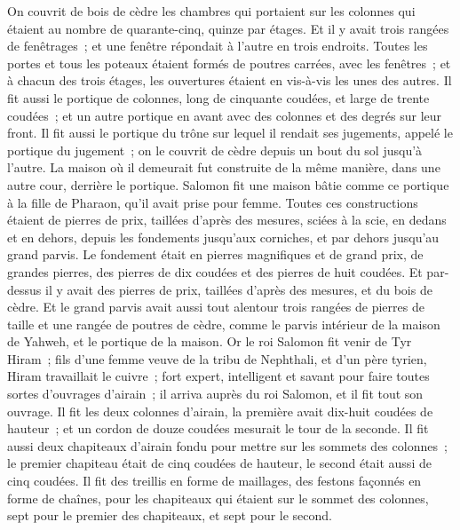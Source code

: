 \begin{multicols}{2}
On couvrit de bois de cèdre les chambres qui portaient sur les colonnes qui étaient au nombre de quarante-cinq, quinze par étages.
Et il y avait trois rangées de fenêtrages~; et une fenêtre répondait à l'autre en trois endroits.
Toutes les portes et tous les poteaux étaient formés de poutres carrées, avec les fenêtres~; et à chacun des trois étages, les ouvertures étaient en vis-à-vis les unes des autres.
Il fit aussi le portique de colonnes, long de cinquante coudées, et large de trente coudées~; et un autre portique en avant avec des colonnes et des degrés sur leur front.
Il fit aussi le portique du trône sur lequel il rendait ses jugements, appelé le portique du jugement~; on le couvrit de cèdre depuis un bout du sol jusqu'à l'autre.
La maison où il demeurait fut construite de la même manière, dans une autre cour, derrière le portique. Salomon fit une maison bâtie comme ce portique à la fille de Pharaon, qu'il avait prise pour femme.
Toutes ces constructions étaient de pierres de prix, taillées d'après des mesures, sciées à la scie, en dedans et en dehors, depuis les fondements jusqu'aux corniches, et par dehors jusqu'au grand parvis.
Le fondement était en pierres magnifiques et de grand prix, de grandes pierres, des pierres de dix coudées et des pierres de huit coudées.
Et par-dessus il y avait des pierres de prix, taillées d'après des mesures, et du bois de cèdre.
Et le grand parvis avait aussi tout alentour trois rangées de pierres de taille et une rangée de poutres de cèdre, comme le parvis intérieur de la maison de Yahweh, et le portique de la maison.
Or le roi Salomon fit venir de Tyr Hiram~;
fils d'une femme veuve de la tribu de Nephthali, et d'un père tyrien, Hiram travaillait le cuivre~; fort expert, intelligent et savant pour faire toutes sortes d'ouvrages d'airain~; il arriva auprès du roi Salomon, et il fit tout son ouvrage.
Il fit les deux colonnes d'airain, la première avait dix-huit coudées de hauteur~; et un cordon de douze coudées mesurait le tour de la seconde.
Il fit aussi deux chapiteaux d'airain fondu pour mettre sur les sommets des colonnes~; le premier chapiteau était de cinq coudées de hauteur, le second était aussi de cinq coudées.
Il fit des treillis en forme de maillages, des festons façonnés en forme de chaînes, pour les chapiteaux qui étaient sur le sommet des colonnes, sept pour le premier des chapiteaux, et sept pour le second.

\end{multicols}
